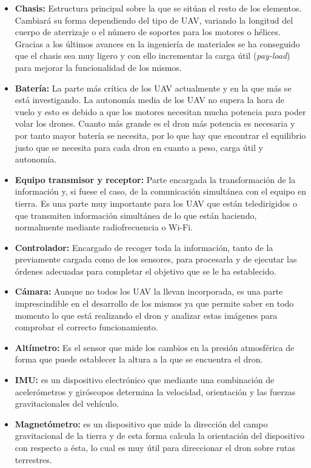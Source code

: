 \begin{itemize}
		\item \textbf{Chasis:} Estructura principal  sobre  la  que  se sitúan el resto de los elementos. Cambiará su forma dependiendo del tipo de UAV, variando la longitud del cuerpo de aterrizaje o el número de soportes para los motores o hélices. Gracias a los últimos avances en la ingeniería de materiales se ha conseguido que el chasis sea muy ligero y con ello incrementar la carga útil (\textit{pay-load}) para mejorar la funcionalidad de los mismos.
		\item \textbf{Batería:} La parte más crítica de los UAV actualmente y en la que más se está investigando. La autonomía media de los UAV no supera la hora de vuelo y esto es debido a que los motores necesitan mucha potencia para poder volar los drones. Cuanto más grande es el dron más potencia es necesaria y por tanto mayor batería se necesita, por lo que hay que encontrar el equilibrio justo que se necesita para cada dron en cuanto a peso, carga útil y autonomía. 
		\item \textbf{Equipo transmisor y receptor:} Parte encargada la transformación de la información y, si fuese el caso, de la comunicación simultánea con el equipo en tierra. Es una parte muy importante para los UAV que están teledirigidos o que transmiten información simultánea de lo que están haciendo, normalmente mediante radiofrecuencia o Wi-Fi.
		\item \textbf{Controlador:} Encargado de recoger toda la información, tanto de la previamente cargada como de los sensores, para procesarla y de ejecutar las órdenes adecuadas para completar el objetivo que se le ha establecido. 
		\item \textbf{Cámara:} Aunque no todos los UAV la llevan incorporada, es una parte imprescindible en el desarrollo de los mismos ya que permite saber en todo momento lo que está realizando el dron y analizar estas imágenes para comprobar el correcto funcionamiento.
		\item \textbf{Altímetro:} Es el sensor que mide los cambios en la presión atmosférica de forma que puede establecer la altura a la que se encuentra el dron.
		\item \textbf{IMU:} es un dispositivo electrónico que mediante una combinación de acelerómetros y giróscopos determina la velocidad, orientación y las fuerzas gravitacionales del vehículo.
		\item \textbf{Magnetómetro:} es un dispositivo que mide la dirección del campo gravitacional de la tierra y de esta forma calcula la orientación del dispositivo con respecto a ésta, lo cual es muy útil para direccionar el dron sobre rutas terrestres.
	\end{itemize}

